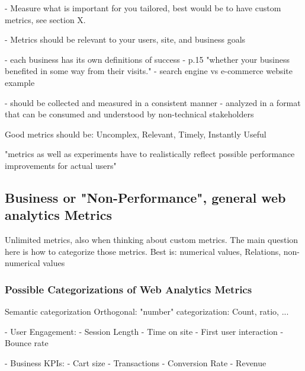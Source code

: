 
- Measure what is important for you
tailored, best would be to have custom metrics, see section X.

- Metrics should be relevant to your users, site, and business goals

- each business has its own definitions of success
- p.15 "whether your business benefited in some way from their visits."
- search engine vs e-commerce website example




- should be collected and measured in a consistent manner
- analyzed in a format that can be consumed and understood by non-technical stakeholders

 Good metrics should be: Uncomplex, Relevant, Timely, Instantly Useful
 

"metrics as well as experiments have to realistically reflect possible performance improvements for actual users"







\subsection{Business or "Non-Performance", general web analytics Metrics}

Unlimited metrics, also when thinking about custom metrics.
The main question here is how to categorize those metrics.
Best is: numerical values, Relations, non-numerical values


\subsubsection{Possible Categorizations of Web Analytics Metrics}


Semantic categorization
Orthogonal: "number" categorization: Count, ratio, ...


- User Engagement:
	- Session Length
	- Time on site
	- First user interaction
	- Bounce rate

- Business KPIs:
	- Cart size
	- Transactions
	- Conversion Rate
	- Revenue

